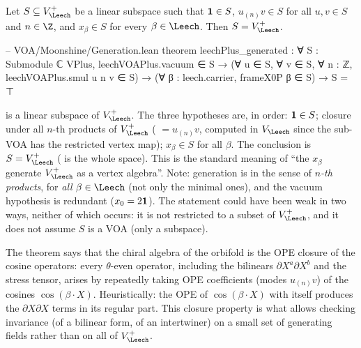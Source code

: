 \begin{theorem}[Generation]\label{ch04:thm:gen}
Let $S\subseteq V_\Leech^+$ be a linear subspace such that $\mathbf{1}\in S$, $u_{(n)}v\in S$ for all
$u,v\in S$ and $n\in\Z$, and $x_\beta\in S$ for every $\beta\in\Leech$. Then $S=V_\Leech^+$.
\end{theorem}

\begin{leancode}
-- VOA/Moonshine/Generation.lean
theorem leechPlus_generated : ∀ S : Submodule ℂ VPlus, leechVOAPlus.vacuum ∈ S →
    (∀ u ∈ S, ∀ v ∈ S, ∀ n : ℤ, leechVOAPlus.smul u n v ∈ S) →
    (∀ β : leech.carrier, frameX0P β ∈ S) → S = ⊤
\end{leancode}

\begin{dictionary}
 is a linear subspace of $V_\Leech^+$. The three hypotheses are, in
order: $\mathbf{1}\in S$; closure under all $n$-th products of $V_\Leech^+$ (
$=u_{(n)}v$, computed in $V_\Leech$ since the sub-VOA has the restricted vertex map);
$x_\beta\in S$ for all $\beta$. The conclusion  is $S=V_\Leech^+$ ( is the whole
space). This is the standard meaning of ``the $x_\beta$ generate $V_\Leech^+$ as a vertex algebra''.
Note: generation is in the sense of \emph{$n$-th products}, for \emph{all} $\beta\in\Leech$ (not only
the minimal ones), and the vacuum hypothesis is redundant ($x_0=2\mathbf{1}$). The statement could
have been weak in two ways, neither of which occurs: it is not restricted to a subset of
$V_\Leech^+$, and it does not assume $S$ is a VOA (only a subspace).
\end{dictionary}

\begin{physics}
The theorem says that the chiral algebra of the orbifold is the OPE closure of the cosine operators: every $\theta$-even operator, including the bilinears $\partial X^a\partial X^b$ and the stress tensor, arises by repeatedly taking OPE coefficients (modes $u_{(n)}v$) of the cosines $\cos(\beta\cdot X)$. Heuristically: the OPE of $\cos(\beta\cdot X)$ with itself produces the $\partial X\partial X$ terms in its regular part. This closure property is what allows checking invariance (of a bilinear form, of an intertwiner) on a small set of generating fields rather than on all of $V_\Leech^+$.
\end{physics}

